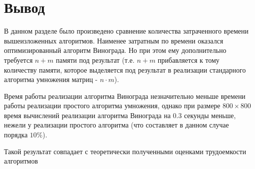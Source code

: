 \section*{Вывод}
В данном разделе было произведено сравнение количества затраченного вре­мени вышеизложенных алгоритмов.
Наименее затратным по времени оказался оптимизированный алгоритм Винограда.
Но при этом ему дополнительно требуется $n+m$ памяти под результат (т.е. $n+m$ прибавляется к тому количеству памяти, которое выделяется под результат в реализации стандарного алгоритма умножения матриц - $n \cdot m$).

Время работы реализации алгоритма Винограда незначительно меньше времени работы реализации простого алгоритма умножения, однако при размере $800 \times 800$ время вычислений реализации алгоритма Винограда на 0.3 секунды меньше, нежели у реализации простого алгоритма (что составляет в данном случае порядка $10\%$).

Такой результат совпадает с теоретически полученными оценками трудоемкости алгоритмов 